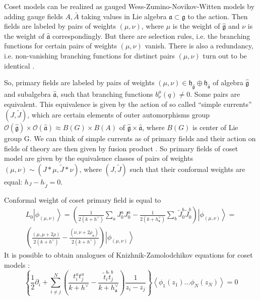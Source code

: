 \documentclass[a4paper]{jpconf}
\theoremstyle{definition}
\newcommand{\gf}{\mathfrak{g}}
\newcommand{\af}{\mathfrak{a}}
\newcommand{\hf}{\mathfrak{h}}
\newcommand{\gfh}{\hat{\mathfrak{g}}}
\newcommand{\afh}{\hat{\mathfrak{a}}}
\theoremstyle{definition} \newtheorem{Def}{Definition}
\begin{document}
Coset models can be realized as gauged Wess-Zumino-Novikov-Witten models by adding gauge fields  $A, \bar{A}$ taking values in Lie algebra $\af\subset \gf$ to the action\cite{gawdzki1988g}. Then fields are labeled by pairs of weights $(\mu,\nu)$, where $\mu$ is the weight of $\gfh$ and $\nu$ is the weight of $\afh$ correspondingly. But there are selection rules, i.e. the branching functions for certain pairs of weights $(\mu,\nu)$ vanish. There is also a redundancy, i.e. non-vanishing branching functions for distinct pairs $(\mu,\nu)$ turn out to be identical \cite{fuchs1996resolution,schellekens1990field}.

So, primary fields are labeled by pairs of weights $(\mu,\nu)\in \hf_{\gfh}\oplus \hf_{\afh}$  of algebra $\gfh$ and subalgebra $\afh$, such that branching functions $b^{\mu}_{\nu}(q)\neq 0$. Some pairs are equivalent. This equivalence is given by the action of so called ``simple currents'' $(J,\tilde{J})$, which are certain elements of outer  automorphisms group $\mathcal{O}(\gfh)\times \mathcal{O}(\afh)\approx B(G)\times B(A)$ of $\gfh\times\afh$, where $B(G)$ is center of Lie group G. We can think of simple currents as of primary fields and their action on fields of theory are then given by fusion product \cite{difrancesco1997cft}.  So primary fields of coset model are given by the equivalence classes of pairs of weights $(\mu,\nu)\sim (J*\mu,\tilde{J}*\nu)$, where $(J,\tilde J)$ such that their conformal weights are equal:  $h_{J}-h_{\tilde{J}}=0$. 

Conformal weight of coset primary field is equal to
\begin{multline}
  L_0\left|\phi_{(\mu,\nu)}\right>=\left(\frac{1}{2(k+h^{\vee})}\sum_aJ^a_0J^a_0-\frac{1}{2(k+h_{\af}^{\vee})}\sum_b \tilde{J}^b_0 \tilde{J}^b_0 \right)
  \left|\phi_{(\mu,\nu)}\right>=\\
  \left(\frac{(\mu,\mu+2\rho)}{2(k+h^{\vee})}-\frac{(\nu,\nu+2\rho_{\af})}{2(k+h^{\vee})}\right)\left|\phi_{(\mu,\nu)}\right>
\end{multline}
It is possible to obtain analogues of Knizhnik-Zamolodchikov equations for coset models \cite{kogan1997knizhnik}:
\begin{equation}
  \left\{\frac{1}{2}\partial_{i} + \sum_{i\neq j}^{N}\left(\frac{t^{a}_{i}t^{a}_{j}}{k+h^{\vee}}-\frac{\tilde t^{b}_{i}\tilde t^{b}_{j}}{k+h^{\vee}_{\af}}\right)\frac{1}{z_{i}-z_{j}}\right\} \left<\phi_{1}(z_{1})\dots \phi_{N}(z_{N})\right>=0
  \label{eq:6}
\end{equation}
\end{document}
